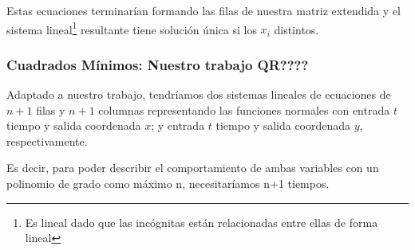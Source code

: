 Estas ecuaciones terminarían formando las filas de nuestra matriz extendida y el sistema
lineal\footnote{Es lineal dado que las incógnitas están relacionadas entre ellas de forma lineal}
resultante tiene solución única si los $x_i$ distintos.

\subsubsection{Cuadrados Mínimos: Nuestro trabajo \textbf{QR????}}

Adaptado a nuestro trabajo, tendríamos dos sistemas lineales de ecuaciones de $n+1$ filas y $n+1$
columnas representando las funciones normales con entrada $t$ tiempo y salida coordenada $x$; y
entrada $t$ tiempo y salida coordenada $y$, respectivamente.

Es decir, para poder describir el comportamiento de ambas variables con un polinomio de grado como
máximo n, necesitaríamos n+1 tiempos.

